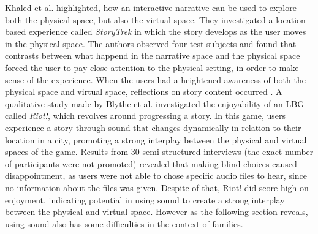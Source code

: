 Khaled et al. highlighted, how an interactive narrative can be used to explore both the physical space, but also the virtual space. They investigated a location-based experience called \textit{StoryTrek} in which the story develops as the user moves in the physical space. The authors observed four test subjects and found that contrasts between what happend in the narrative space and the physical space forced the user to pay close attention to the physical setting, in order to make sense of the experience. When the users had a heightened awareness of both the physical space and virtual space, reflections on story content occurred \cite{StoryTrek}. A qualitative study made by Blythe et al. investigated the enjoyability of an LBG called \textit{Riot!}, which revolves around progressing a story\cite{InterdisciplinaryCriticism}. In this game, users experience a story through sound that changes dynamically in relation to their location in a city, promoting a strong interplay between the physical and virtual spaces of the game. Results from 30 semi-structured interviews (the exact number of participants were not promoted) revealed that making blind choices caused disappointment, as users were not able to chose specific audio files to hear, since no information about the files was given. Despite of that, Riot! did score high on enjoyment, indicating potential in using sound to create a strong interplay between the physical and virtual space. However as the following section reveals, using sound also has some difficulties in the context of families.